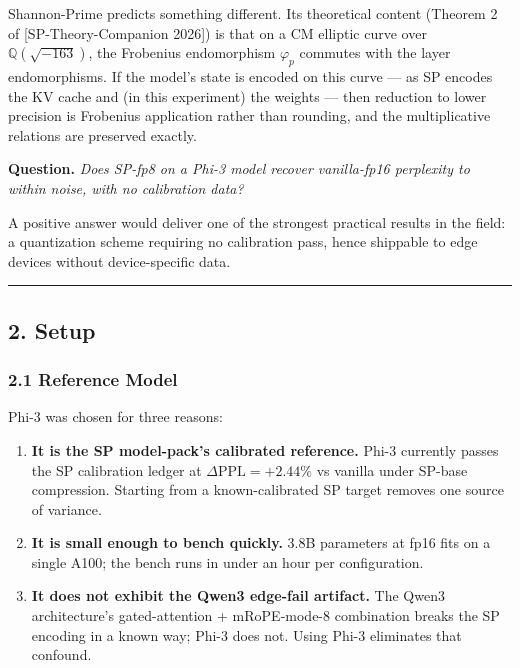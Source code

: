 \documentclass[
  11pt,
]{article}
\providecommand{\tightlist}{%
  \setlength{\itemsep}{0pt}\setlength{\parskip}{0pt}}
\begin{document}
Shannon-Prime predicts something different. Its theoretical content
(Theorem 2 of {[}SP-Theory-Companion 2026{]}) is that on a CM elliptic
curve over \(\mathbb{Q}(\sqrt{-163})\), the Frobenius endomorphism
\(\varphi_p\) commutes with the layer endomorphisms. If the model's
state is encoded on this curve --- as SP encodes the KV cache and (in
this experiment) the weights --- then reduction to lower precision is
Frobenius application rather than rounding, and the multiplicative
relations are preserved exactly.

\textbf{Question.} \emph{Does SP-fp8 on a Phi-3 model recover
vanilla-fp16 perplexity to within noise, with no calibration data?}

A positive answer would deliver one of the strongest practical results
in the field: a quantization scheme requiring no calibration pass, hence
shippable to edge devices without device-specific data.

\begin{center}\rule{0.5\linewidth}{0.5pt}\end{center}

\hypertarget{setup}{%
\subsection{2. Setup}\label{setup}}

\hypertarget{reference-model}{%
\subsubsection{2.1 Reference Model}\label{reference-model}}

Phi-3 was chosen for three reasons:

\begin{enumerate}
\def\labelenumi{\arabic{enumi}.}
\tightlist
\item
  \textbf{It is the SP model-pack's calibrated reference.} Phi-3
  currently passes the SP calibration ledger at
  \(\Delta\mathrm{PPL} = +2.44\%\) vs vanilla under SP-base compression.
  Starting from a known-calibrated SP target removes one source of
  variance.
\item
  \textbf{It is small enough to bench quickly.} 3.8B parameters at fp16
  fits on a single A100; the bench runs in under an hour per
  configuration.
\item
  \textbf{It does not exhibit the Qwen3 edge-fail artifact.} The Qwen3
  architecture's gated-attention + mRoPE-mode-8 combination breaks the
  SP encoding in a known way; Phi-3 does not. Using Phi-3 eliminates
  that confound.
\end{enumerate}
\end{document}
